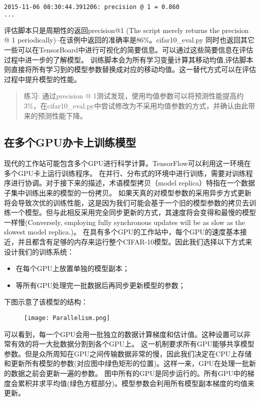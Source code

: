 \begin{lstlisting}[language=Bash]
2015-11-06 08:30:44.391206: precision @ 1 = 0.860
...
\end{lstlisting}

评估脚本只是周期性的返回precision@1 (The script merely returns the precision @ 1 periodically)--在该例中返回的准确率是86\%。cifar10\_eval.py 同时也返回其它一些可以在TensorBoard中进行可视化的简要信息。可以通过这些简要信息在评估过程中进一步的了解模型。
训练脚本会为所有学习变量计算其移动均值,评估脚本则直接将所有学习到的模型参数替换成对应的移动均值。这一替代方式可以在评估过程中提升模型的性能。

\begin{quote}
练习: 通过precision @ 1测试发现，使用均值参数可以将预测性能提高约3\%，在cifar10\_eval.py中尝试修改为不采用均值参数的方式，并确认由此带来的预测性能下降。
\end{quote}
\subsection{在多个GPU办卡上训练模型}
现代的工作站可能包含多个GPU进行科学计算。TensorFlow可以利用这一环境在多个GPU卡上运行训练程序。
在并行、分布式的环境中进行训练，需要对训练程序进行协调。对于接下来的描述，术语模型拷贝（model replica）特指在一个数据子集中训练出来的模型的一份拷贝。
如果天真的对模型参数的采用异步方式更新将会导致次优的训练性能，这是因为我们可能会基于一个旧的模型参数的拷贝去训练一个模型。但与此相反采用完全同步更新的方式，其速度将会变得和最慢的模型一样慢(Conversely, employing fully synchronous updates will be as slow as the slowest model replica.)。
在具有多个GPU的工作站中，每个GPU的速度基本接近，并且都含有足够的内存来运行整个CIFAR-10模型。因此我们选择以下方式来设计我们的训练系统：

\begin{itemize}
	\item 在每个GPU上放置单独的模型副本；
	\item 等所有GPU处理完一批数据后再同步更新模型的参数；
\end{itemize}
下图示意了该模型的结构：

\begin{figure}[H]
\centering
\texttt{[image: Parallelism.png]}
\end{figure}
可以看到，每一个GPU会用一批独立的数据计算梯度和估计值。这种设置可以非常有效的将一大批数据分割到各个GPU上。
这一机制要求所有GPU能够共享模型参数。但是众所周知在GPU之间传输数据非常的慢，因此我们决定在CPU上存储和更新所有模型的参数(对应图中绿色矩形的位置)。这样一来，GPU在处理一批新的数据之前会更新一遍的参数。
图中所有的GPU是同步运行的。所有GPU中的梯度会累积并求平均值(绿色方框部分)。模型参数会利用所有模型副本梯度的均值来更新。
